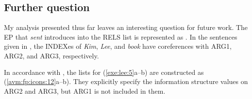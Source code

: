 

\subsection{Further question}
\label{10-4:ssec:further}

My analysis presented thus far leaves an interesting question for
future work.  The EP that \textit{sent} introduces into the RELS list
is represented as . In the sentences given in
, the INDEXes of \textit{Kim}, \textit{Lee}, and
\textit{book} have coreferences with ARG1, ARG2, and ARG3,
respectively.




\noindent In accordance with , the 
lists for (\ref{exe:lee:5}a--b) are constructed as
(\ref{avm:fp:icons:12}a--b).  They explicitly specify the information
structure values on ARG2 and ARG3, but ARG1 is not included in them.





